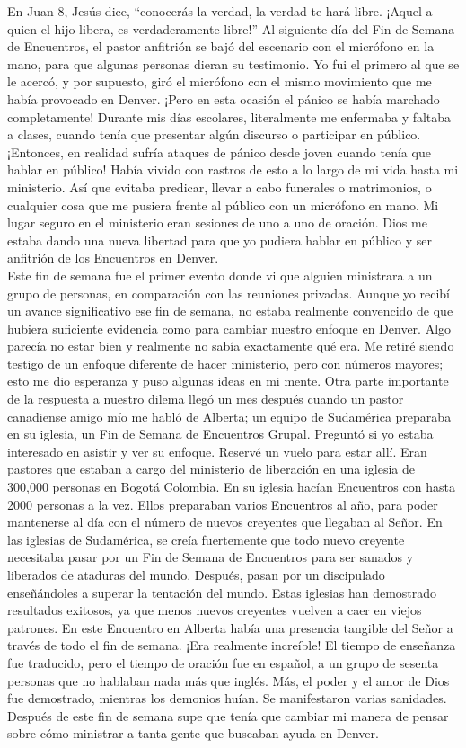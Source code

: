 \documentclass[twoside, 12pt]{book}
\begin{document}
En Juan 8, Jesús dice, “conocerás la verdad, la verdad te hará libre. ¡Aquel a quien el hijo libera, es verdaderamente libre!” Al siguiente día del Fin de Semana de Encuentros, el pastor anfitrión se bajó del escenario con el micrófono en la mano, para que algunas personas dieran su testimonio. Yo fui el primero al que se le acercó, y por supuesto, giró el micrófono con el mismo movimiento que me había provocado en Denver.  ¡Pero en esta ocasión el pánico se había marchado completamente! Durante mis días escolares, literalmente me enfermaba y faltaba a clases, cuando tenía que presentar algún discurso o participar en público. ¡Entonces, en realidad sufría ataques de pánico desde joven cuando tenía que hablar en público! Había vivido con rastros de esto a lo largo de mi vida hasta mi ministerio. Así que evitaba predicar, llevar a cabo funerales o matrimonios, o cualquier cosa que me pusiera frente al público con un micrófono en mano. Mi lugar seguro en el ministerio eran sesiones de uno a uno de oración. Dios me estaba dando una nueva libertad para que yo pudiera hablar en público y ser anfitrión de los Encuentros en Denver.\\
 
Este fin de semana fue el primer evento donde vi que alguien ministrara a un grupo de personas, en comparación con las reuniones privadas. Aunque yo recibí un avance significativo ese fin de semana, no estaba realmente convencido de que hubiera suficiente evidencia como para cambiar nuestro enfoque en Denver. Algo parecía no estar bien y realmente no sabía exactamente qué era. Me retiré siendo testigo de un enfoque diferente de hacer ministerio, pero con números mayores; esto me dio esperanza y puso algunas ideas en mi mente. 
Otra parte importante de la respuesta a nuestro dilema llegó un mes después cuando un pastor canadiense amigo mío me habló de Alberta; un equipo de Sudamérica preparaba en su iglesia, un Fin de Semana de Encuentros Grupal. Preguntó si yo estaba interesado en asistir y ver su enfoque. Reservé un vuelo para estar allí. Eran pastores que estaban a cargo del ministerio de liberación en una iglesia de 300,000 personas en Bogotá Colombia. En su iglesia hacían Encuentros con hasta 2000 personas a la vez. Ellos preparaban varios Encuentros al año, para poder mantenerse al día con el número de nuevos creyentes que llegaban al Señor. En las iglesias de Sudamérica, se creía fuertemente que todo nuevo creyente necesitaba pasar por un Fin de Semana de Encuentros para ser sanados y liberados de ataduras del mundo. Después, pasan por un discipulado enseñándoles a superar la tentación del mundo. Estas iglesias han demostrado resultados exitosos, ya que menos nuevos creyentes vuelven a caer en viejos patrones. En este Encuentro en Alberta había una presencia tangible del Señor a través de todo el fin de semana.  ¡Era realmente increíble! El tiempo de enseñanza fue traducido, pero el tiempo de oración fue en español, a un grupo de sesenta personas que no hablaban nada más que inglés. Más, el poder y el amor de Dios fue demostrado, mientras los demonios huían. Se manifestaron varias sanidades. Después de este fin de semana supe que tenía que cambiar mi manera de pensar sobre cómo ministrar a tanta gente que buscaban ayuda en Denver.\\
\end{document}
